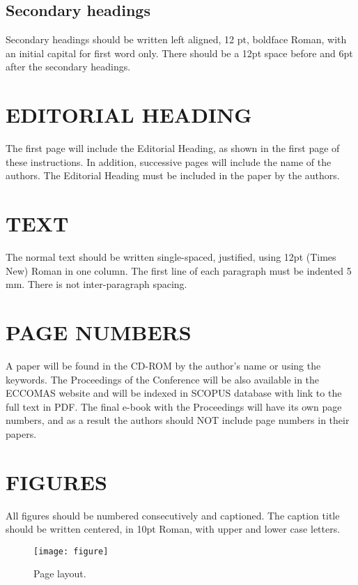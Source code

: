 \documentclass{uncecomp2019}
\begin{document}
\subsection{Secondary headings}

Secondary headings should be written left aligned, 12 pt, boldface Roman, with
an initial capital for first word only. There should be a 12pt space before and
6pt after the secondary headings.

\section{EDITORIAL HEADING}

The first page will include the Editorial Heading, as shown in the first page
of these instructions. In addition, successive pages will include the name of
the authors. The Editorial Heading must be included in the paper by the authors.

\section{TEXT}

The normal text should be written single-spaced, justified, using 12pt (Times
New) Roman in one column. The first line of each paragraph must be indented
5 mm. There is not inter-paragraph spacing.

\section{PAGE NUMBERS}

A paper will be found in the CD-ROM by the author's name or using the keywords.
The Proceedings of the Conference will be also available in the ECCOMAS website
and will be indexed in SCOPUS database with link to the full text in PDF. The
final e-book with the Proceedings will have its own page numbers, and as a result
the authors should NOT include page numbers in their papers.

\section{FIGURES}

All figures should be numbered consecutively and captioned. The caption title
should be written centered, in 10pt Roman, with upper and lower case letters.

\begin{figure}[ht]
  \begin{center}
    \texttt{[image: figure]}
    \caption{Page layout.}
  \end{center}
\end{figure}
\end{document}
